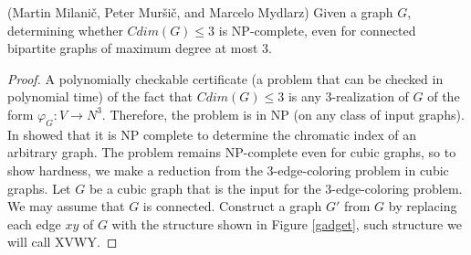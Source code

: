 \documentclass[12pt,a4paper,titlepage,openany]{report}
\begin{document}
\begin{theorem}(Martin Milani\v c, Peter Mur\v si\v c, and Marcelo Mydlarz)\newline
Given a graph $G$, determining whether $Cdim(G) \leq 3$ is NP-complete, even for connected bipartite graphs of maximum degree at most 3.
\end{theorem}
\begin{proof}
A polynomially checkable certificate (a problem that can be checked in polynomial time) of the fact that $Cdim(G) \leq 3$ is any 3-realization of $G$ of the form $\varphi _G : V \to N^3$. Therefore, the problem is in NP (on any class of input graphs).\newline
In \cite{Ian} showed that it is NP complete to determine the chromatic index of an arbitrary graph. The problem remains NP-complete even for cubic graphs, so to show hardness, we make a reduction from the 3-edge-coloring problem in cubic graphs.\newline
Let $G$ be a cubic graph that is the input for the
3-edge-coloring problem. We may assume that $G$ is connected. Construct a graph $G'$ from $G$ by replacing each edge $xy$ of $G$ with the structure shown in Figure \ref{gadget}, such structure we will call XVWY.


\end{proof}
\end{document}
